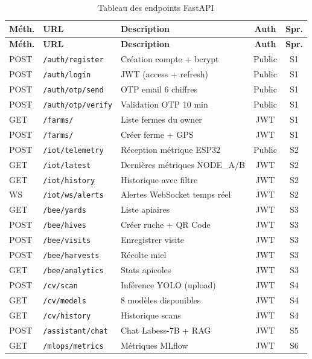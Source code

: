 \documentclass[12pt,a4paper,oneside]{report}
\newcommand{\api}[1]{\texttt{\color{farmblue}\small#1}}
\begin{document}
\begin{longtable}{lll cc}
\caption{Tableau des endpoints FastAPI} \label{tab:endpoints}\\
\toprule
\textbf{Méth.}&\textbf{URL}&\textbf{Description}&\textbf{Auth}&\textbf{Spr.}\\
\midrule\endfirsthead
\toprule\textbf{Méth.}&\textbf{URL}&\textbf{Description}&\textbf{Auth}&\textbf{Spr.}\\\midrule\endhead
\bottomrule\endfoot
POST&\api{/auth/register}       &Création compte + bcrypt         &Public&S1\\
POST&\api{/auth/login}          &JWT (access + refresh)           &Public&S1\\
POST&\api{/auth/otp/send}       &OTP email 6 chiffres             &Public&S1\\
POST&\api{/auth/otp/verify}     &Validation OTP 10 min            &Public&S1\\
GET &\api{/farms/}              &Liste fermes du owner            &JWT  &S1\\
POST&\api{/farms/}              &Créer ferme + GPS                &JWT  &S1\\
POST&\api{/iot/telemetry}       &Réception métrique ESP32         &Public&S2\\
GET &\api{/iot/latest}          &Dernières métriques NODE\_A/B    &JWT  &S2\\
GET &\api{/iot/history}         &Historique avec filtre           &JWT  &S2\\
WS  &\api{/iot/ws/alerts}       &Alertes WebSocket temps réel     &JWT  &S2\\
GET &\api{/bee/yards}           &Liste apiaires                   &JWT  &S3\\
POST&\api{/bee/hives}           &Créer ruche + QR Code            &JWT  &S3\\
POST&\api{/bee/visits}          &Enregistrer visite               &JWT  &S3\\
POST&\api{/bee/harvests}        &Récolte miel                     &JWT  &S3\\
GET &\api{/bee/analytics}       &Stats apicoles                   &JWT  &S3\\
POST&\api{/cv/scan}             &Inférence YOLO (upload)          &JWT  &S4\\
GET &\api{/cv/models}           &8 modèles disponibles            &JWT  &S4\\
GET &\api{/cv/history}          &Historique scans                 &JWT  &S4\\
POST&\api{/assistant/chat}      &Chat Labess-7B + RAG             &JWT  &S5\\
GET &\api{/mlops/metrics}       &Métriques MLflow                 &JWT  &S6\\
\bottomrule
\end{longtable}
\end{document}
